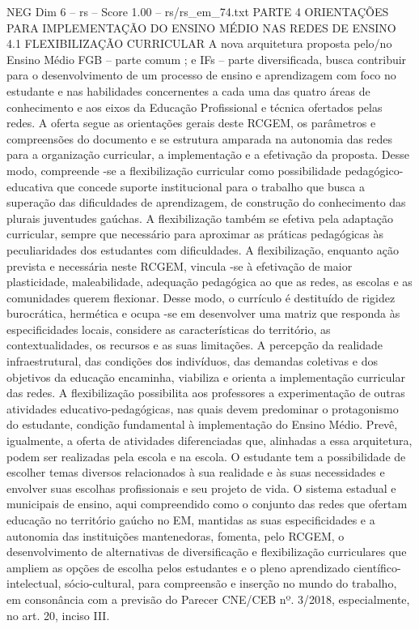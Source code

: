 \begin{textsample}{NEG Dim 6 – rs – Score 1.00 – rs/rs\_em\_74.txt}  \label{ex:f6_neg_107}
PARTE 4 ORIENTAÇÕES PARA IMPLEMENTAÇÃO DO ENSINO MÉDIO NAS REDES DE ENSINO 4.1 FLEXIBILIZAÇÃO CURRICULAR A nova arquitetura proposta pelo/no Ensino Médio FGB – parte comum ; e IFs – parte diversificada, busca contribuir para o desenvolvimento de um processo de ensino e aprendizagem com foco no estudante e nas habilidades concernentes a cada uma das quatro áreas de conhecimento e aos eixos da Educação Profissional e técnica ofertados pelas redes.
A oferta segue as orientações gerais deste RCGEM, os parâmetros e compreensões do documento e se estrutura amparada na autonomia das redes para a organização curricular, a implementação e a efetivação da proposta.
Desse modo, compreende -se a flexibilização curricular como possibilidade pedagógico-educativa que concede suporte institucional para o trabalho que busca a superação das dificuldades de aprendizagem, de construção do conhecimento das plurais juventudes gaúchas.
A flexibilização também se efetiva pela adaptação curricular, sempre que necessário para aproximar as práticas pedagógicas às peculiaridades dos estudantes com dificuldades.
A flexibilização, enquanto ação prevista e necessária neste RCGEM, vincula -se à efetivação de maior plasticidade, maleabilidade, adequação pedagógica ao que as redes, as escolas e as comunidades querem flexionar.
Desse modo, o currículo é destituído de rigidez burocrática, hermética e ocupa -se em desenvolver uma matriz que responda às especificidades locais, considere as características do território, as contextualidades, os recursos e as suas limitações.
A percepção da realidade infraestrutural, das condições dos indivíduos, das demandas coletivas e dos objetivos da educação encaminha, viabiliza e orienta a implementação curricular das redes.
A flexibilização possibilita aos professores a experimentação de outras atividades educativo-pedagógicas, nas quais devem predominar o protagonismo do estudante, condição fundamental à implementação do Ensino Médio.
Prevê, igualmente, a oferta de atividades diferenciadas que, alinhadas a essa arquitetura, podem ser realizadas pela escola e na escola.
O estudante tem a possibilidade de escolher temas diversos relacionados à sua realidade e às suas necessidades e envolver suas escolhas profissionais e seu projeto de vida.
O sistema estadual e municipais de ensino, aqui compreendido como o conjunto das redes que ofertam educação no território gaúcho no EM, mantidas as suas especificidades e a autonomia das instituições mantenedoras, fomenta, pelo RCGEM, o desenvolvimento de alternativas de diversificação e flexibilização curriculares que ampliem as opções de escolha pelos estudantes e o pleno aprendizado científico-intelectual, sócio-cultural, para compreensão e inserção no mundo do trabalho, em consonância com a previsão do Parecer CNE/CEB nº. 3/2018, especialmente, no art. 20, inciso III.

\end{textsample}
